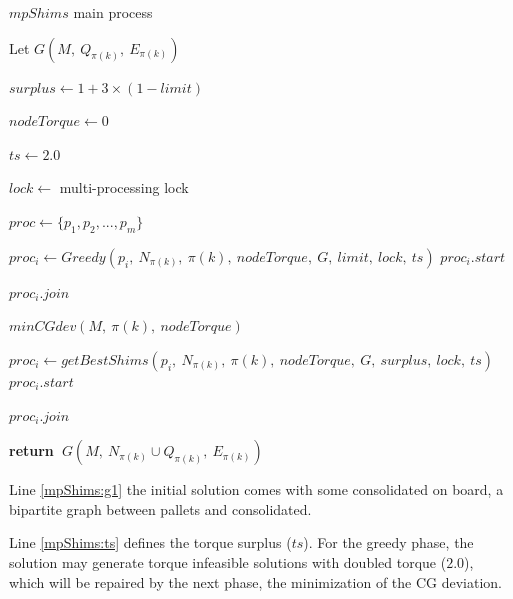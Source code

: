 \documentclass[preprint,authoryear]{elsarticle}
\renewcommand{\Return}{\State \bf {return}~}
\begin{document}
\begin{algorithm}[H]
	\caption{$mpShims$ main process}  \label{alg:mpShims}
	
	\begin{algorithmic}[1]
		
		
		\State Let $G(M,\ Q_{\pi(k)},\ E_{\pi(k)})$ \label{mpShims:g1} 
		
		\State $surplus \gets 1 + 3 \times (1 - limit)$
		
		\State $nodeTorque \gets 0$
		
		\State $ts \gets 2.0$  \label{mpShims:ts}
		
		\State $lock \gets$ multi-processing lock  \label{mpShims:lock} 
		
		\State $proc \gets \{p_1,p_2,..., p_m\}$  
		
		\State $proc_i \gets Greedy(p_i,\ N_{\pi(k)},\ \pi(k),\ nodeTorque,\ G,\ limit,\ lock,\ ts )$   \label{mpShims:greedy}
		\State $proc_i.start$
		\EndFor
		
		\State $proc_i.join$ \label{mpShims:join1}
		\EndFor
		
		\State $minCGdev(M,\ \pi(k),\ nodeTorque)$  \label{mpShims:minCGdev} 
		
		\State $proc_i \gets getBestShims(p_i,\ N_{\pi(k)},\ \pi(k),\ nodeTorque,\ G,\ surplus,\ lock,\ ts )$ \label{mpShims:getBestShims}
		\State $proc_i.start$
		\EndFor
		
		\State $proc_i.join$ \label{mpShims:join2}

		\EndFor
		
		\Return $G(M,\ N_{\pi(k)} \cup Q_{\pi(k)},\ E_{\pi(k)})$ \label{mpShims:return}
		
		\EndProcedure
		
	\end{algorithmic}
\end{algorithm}

Line \ref{mpShims:g1} the initial solution comes with some consolidated on board, a bipartite graph between pallets and consolidated.

Line \ref{mpShims:ts} defines the torque surplus ($ts$). For the greedy phase, the solution may generate torque infeasible solutions with doubled torque ($2.0$), which will be repaired by the next phase, the minimization of the CG deviation.
\end{document}
